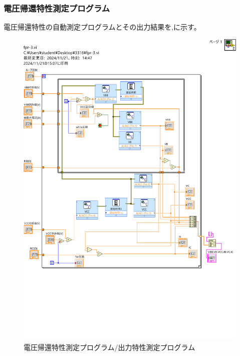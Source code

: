 \documentclass[11pt,dvipdfmx]{jarticle}
\begin{document}
		\subsubsection{電圧帰還特性測定プログラム}
		電圧帰還特性の自動測定プログラムとその出力結果を,に示す。
		\begin{figure}[H]
			\centering
			\includegraphics[scale=0.3]{fig/for-3.pdf}
			\caption{電圧帰還特性測定プログラム/出力特性測定プログラム}
			\label{fig:電圧帰還特性測定プログラム/出力特性測定プログラム}
		\end{figure}
\end{document}
